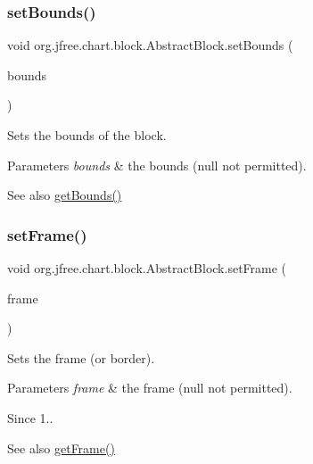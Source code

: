 \subsubsection{\texorpdfstring{set\+Bounds()}{setBounds()}}
{\footnotesize\ttfamily void org.\+jfree.\+chart.\+block.\+Abstract\+Block.\+set\+Bounds (\begin{DoxyParamCaption}\item[{Rectangle2D}]{bounds }\end{DoxyParamCaption})}

Sets the bounds of the block.


\begin{DoxyParams}{Parameters}
{\em bounds} & the bounds ({\ttfamily null} not permitted).\\
\hline
\end{DoxyParams}
\begin{DoxySeeAlso}{See also}
\mbox{\hyperlink{classorg_1_1jfree_1_1chart_1_1block_1_1_abstract_block_a0fc9bf8ea47727f8c10e6ea4c8fe7622}{get\+Bounds()}} 
\end{DoxySeeAlso}
\mbox{\label{classorg_1_1jfree_1_1chart_1_1block_1_1_abstract_block_a44b7622fb43df6da2295e792302359d9}} 
\subsubsection{\texorpdfstring{set\+Frame()}{setFrame()}}
{\footnotesize\ttfamily void org.\+jfree.\+chart.\+block.\+Abstract\+Block.\+set\+Frame (\begin{DoxyParamCaption}\item[{\mbox{\hyperlink{interfaceorg_1_1jfree_1_1chart_1_1block_1_1_block_frame}{Block\+Frame}}}]{frame }\end{DoxyParamCaption})}

Sets the frame (or border).


\begin{DoxyParams}{Parameters}
{\em frame} & the frame ({\ttfamily null} not permitted).\\
\hline
\end{DoxyParams}
\begin{DoxySince}{Since}
1.. 
\end{DoxySince}
\begin{DoxySeeAlso}{See also}
\mbox{\hyperlink{classorg_1_1jfree_1_1chart_1_1block_1_1_abstract_block_a7ac4f2b628be6227111e529d568f162e}{get\+Frame()}} 
\end{DoxySeeAlso}
\mbox{\label{classorg_1_1jfree_1_1chart_1_1block_1_1_abstract_block_a093cf8477abdac969254656d9ef3d36d}} 
